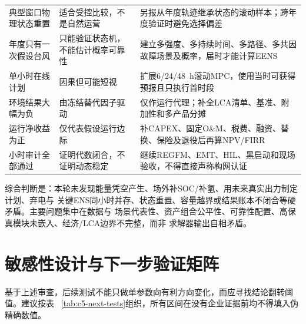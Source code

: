 \begin{longtable}{p{2.8cm}p{4.4cm}p{6.1cm}}
典型窗口物理状态重置 & 适合受控比较，不是自然运营 & 另报从年度轨迹继承状态的滚动样本；跨年度验证时避免选择偏差\\
年度只有一次假设台风 & 只能验证状态机，不能估计概率可靠性 & 建立多强度、多持续时间、多路径、多共因故障场景及概率，届时才能计算EENS\\
单小时在线计划 & 因果但可能短视 & 扩展6/24/48~h滚动MPC，使用当时可获得预报且只执行首时段\\
环境结果大幅为负 & 由冻结替代因子驱动 & 仅作运行代理；补全LCA清单、基准、附加性和多产品分摊\\
运行净收益为正 & 仅代表假设运行边际 & 补CAPEX、固定O\&M、税费、融资、替换、保险及退役后再算NPV/FIRR\\
小时审计全部通过 & 证明代数闭合，不证明动态稳定 & 继续REGFM、EMT、HIL、黑启动和现场验收，不得直接声称构网认证\\
\bottomrule
\end{longtable}

综合判断是：本轮未发现能量凭空产生、场外补SOC/补氢、用未来真实出力制定计划、弃电与
关键ENS同小时并存、状态重置、容量越界或结果账本不闭合等硬矛盾。主要问题集中在数据与
场景代表性、资产组合公平性、可靠性配置、高保真模块未嵌入、经济/LCA边界不完整，而非
求解器输出自相矛盾。

\section{敏感性设计与下一步验证矩阵}

基于上述审查，后续测试不能只做单参数向有利方向变化，而应寻找结论翻转阈值。建议按表
~\ref{tab:c5-next-tests}组织，所有区间在没有企业证据前均不得填入伪精确数值。

